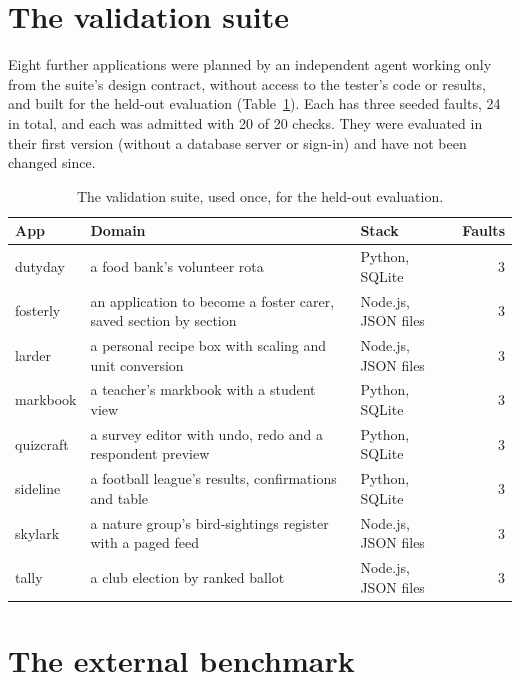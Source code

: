 \section{The validation suite}
\label{sec:valsuite}

Eight further applications were planned by an independent agent working only from the
suite's design contract, without access to the tester's code or results, and built for the
held-out evaluation (Table~\ref{tab:valsuite}). Each has three seeded faults, 24 in total,
and each was admitted with 20 of 20 checks. They were evaluated in their first version
(without a database server or sign-in) and have not been changed since.

\begin{table}[H]
\centering
\small
\caption{The validation suite, used once, for the held-out evaluation.}
\label{tab:valsuite}
\begin{tabularx}{\textwidth}{@{}l X l r@{}}
\toprule
App & Domain & Stack & Faults \\
\midrule
dutyday & a food bank's volunteer rota & Python, SQLite & 3 \\
fosterly & an application to become a foster carer, saved section by section & Node.js, JSON files & 3 \\
larder & a personal recipe box with scaling and unit conversion & Node.js, JSON files & 3 \\
markbook & a teacher's markbook with a student view & Python, SQLite & 3 \\
quizcraft & a survey editor with undo, redo and a respondent preview & Python, SQLite & 3 \\
sideline & a football league's results, confirmations and table & Python, SQLite & 3 \\
skylark & a nature group's bird-sightings register with a paged feed & Node.js, JSON files & 3 \\
tally & a club election by ranked ballot & Node.js, JSON files & 3 \\
\bottomrule
\end{tabularx}
\end{table}

\section{The external benchmark}
\label{sec:external}

